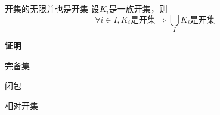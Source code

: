 \begin{theorem}{开集的无限并也是开集}
设${K_i}$是一族开集，则
\begin{equation}
\forall{i}\in{I},K_i\text{是开集}\Rightarrow{\bigcup_{I}K_i\text{是开集}}
\end{equation}
\end{theorem}

\textbf{证明}



\begin{definition}{完备集}

\end{definition}

\begin{definition}{闭包}
\end{definition}

\begin{definition}{相对开集}

\end{definition}
